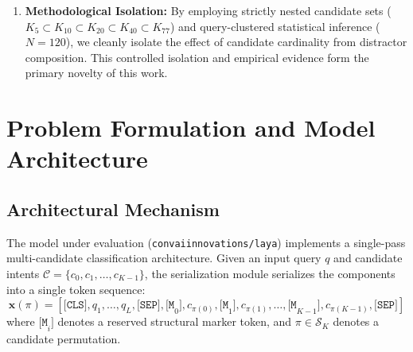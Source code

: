 \documentclass[11pt,a4paper]{article}
\begin{document}
\begin{enumerate}
\begin{itemize}
        \item Inference-time random and cyclic permutation marginalization laws, and
        \item Empirical confidence calibration (ECE) effects.
    \end{itemize}
    \item \textbf{Methodological Isolation:} By employing strictly nested candidate sets ($K_5 \subset K_{10} \subset K_{20} \subset K_{40} \subset K_{77}$) and query-clustered statistical inference ($N=120$), we cleanly isolate the effect of candidate cardinality from distractor composition. This controlled isolation and empirical evidence form the primary novelty of this work.
\end{enumerate}

\section{Problem Formulation and Model Architecture}

\subsection{Architectural Mechanism}

The model under evaluation (\texttt{convaiinnovations/laya}) implements a single-pass multi-candidate classification architecture. Given an input query $q$ and candidate intents $\mathcal{C} = \{c_0, c_1, \dots, c_{K-1}\}$, the serialization module serializes the components into a single token sequence:
\begin{equation}
\mathbf{x}(\pi) = \left[ \texttt{[CLS]}, q_1, \dots, q_L, \texttt{[SEP]}, \texttt{[M}_0\texttt{]}, c_{\pi(0)}, \texttt{[M}_1\texttt{]}, c_{\pi(1)}, \dots, \texttt{[M}_{K-1}\texttt{]}, c_{\pi(K-1)}, \texttt{[SEP]} \right]
\end{equation}
where $\texttt{[M}_i\texttt{]}$ denotes a reserved structural marker token, and $\pi \in \mathcal{S}_K$ denotes a candidate permutation.
\end{document}
